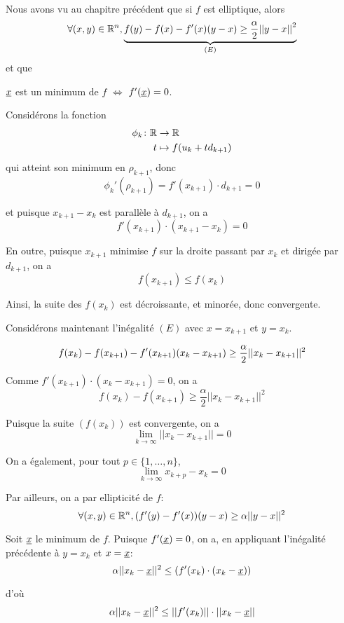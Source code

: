 \documentclass[french,a4paper,10pt]{article}
\begin{document}
	\begin{myproof}\,\\

		Nous avons vu au chapitre précédent que si $f$ est elliptique, alors
		\[
			\forall (x,y)\in\mathbb{R}^n, \underbrace{f(y)-f(x)-f'(x)(y-x)\geq \frac{\alpha}{2}{||y-x||}^2}_{(E)}
		\]
		et que
		\begin{center}
			$\underline{x}$ est un minimum de $f$ $\iff$ $f'(\underline{x})=0$.
		\end{center}

		Considérons la fonction
		\[\begin{aligned}
			\phi_k\colon \mathbb{R}&\to\mathbb{R}\\
			t&\mapsto f(u_k+t d_{k+1})
		\end{aligned}\]
		qui atteint son minimum en $\rho_{k+1}$, donc
		\[
			\phi_k'(\rho_{k+1})=f'(x_{k+1})\cdot d_{k+1}=0
		\]

		et puisque $x_{k+1}-x_k$ est parallèle à $d_{k+1}$, on a
		\[
			f'(x_{k+1})\cdot(x_{k+1}-x_k)=0
		\]

		En outre, puisque $x_{k+1}$ minimise $f$ sur la droite passant par $x_k$
		et dirigée par $d_{k+1}$, on a
		\[
			f(x_{k+1})\leq f(x_k)
		\]

		Ainsi, la suite des $f(x_k)$ est décroissante, et minorée, donc convergente.

		Considérons maintenant l'inégalité $(E)$ avec $x=x_{k+1}$ et $y=x_k$.

		\[
			f(x_k)-f(x_{k+1})-f'(x_{k+1})(x_k-x_{k+1})\geq \frac{\alpha}{2}||x_k-x_{k+1}||^2\\
		\]

		Comme $f'(x_{k+1})\cdot(x_k-x_{k+1})=0$, on a
		\[
			f(x_k)-f(x_{k+1})\geq \frac{\alpha}{2}||x_k-x_{k+1}||^2
		\]

		Puisque la suite $(f(x_k))$ est convergente, on a
		\[
			\lim_{k\to\infty}||x_k-x_{k+1}||=0
		\]

		On a également, pour tout $p\in\{1,\dots,n\}$,
		\[
			\lim_{k\to\infty}x_{k+p}-x_k=0
		\]

		Par ailleurs, on a par ellipticité de $f$:
		\[
			\forall (x,y)\in\mathbb{R}^n, (f'(y)-f'(x))(y-x)\geq \alpha||y-x||^2
		\]

		Soit $\underline{x}$ le minimum de $f$. Puisque $f'(\underline{x})=0$, on a, en appliquant l'inégalité précédente à $y=x_k$ et $x=\underline{x}$:
		\[
			\alpha||x_k-\underline{x}||^2\leq (f'(x_k)\cdot (x_k-\underline{x}))
		\]

		d'où
		\[
			\alpha||x_k-\underline{x}||^2\leq || f'(x_k)||\cdot||x_k-\underline{x}||
		\]


\end{myproof}
\end{document}
